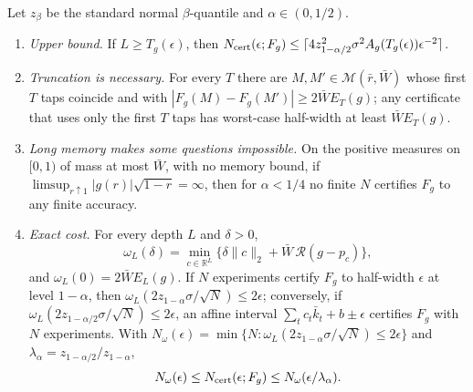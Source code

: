 \begin{theorem}\label{thm:questions}
Let $z_\beta$ be the standard normal $\beta$-quantile and $\alpha\in(0,1/2)$.
\begin{enumerate}[label=(\roman*)]
\item \emph{Upper bound.} If $L\ge T_g(\epsilon)$, then $N_{\rm cert}(\epsilon;F_g)\le\lceil4z_{1-\alpha/2}^2\sigma^2A_g(T_g(\epsilon))\epsilon^{-2}\rceil$.
\item \emph{Truncation is necessary.} For every $T$ there are $M,M'\in\mathcal M(\bar r,\bar W)$ whose first $T$ taps coincide and with $|F_g(M)-F_g(M')|\ge2\bar WE_T(g)$; any certificate that uses only the first $T$ taps has worst-case half-width at least $\bar WE_T(g)$.
\item \emph{Long memory makes some questions impossible.} On the positive measures on $[0,1)$ of mass at most $\bar W$, with no memory bound, if $\limsup_{r\uparrow1}|g(r)|\sqrt{1-r}=\infty$, then for $\alpha<1/4$ no finite $N$ certifies $F_g$ to any finite accuracy.
\item \emph{Exact cost.} For every depth $L$ and $\delta>0$,
\[
 \omega_L(\delta)=\min_{c\in\mathbb R^L}\bigl\{\delta\|c\|_2+\bar W\,\mathcal R(g-p_c)\bigr\},
\]
and $\omega_L(0)=2\bar WE_L(g)$. If $N$ experiments certify $F_g$ to half-width $\epsilon$ at level $1-\alpha$, then $\omega_L(2z_{1-\alpha}\sigma/\sqrt N)\le2\epsilon$; conversely, if $\omega_L(2z_{1-\alpha/2}\sigma/\sqrt N)\le2\epsilon$, an affine interval $\sum_tc_t\bar k_t+b\pm\epsilon$ certifies $F_g$ with $N$ experiments. With $N_\omega(\epsilon)=\min\{N:\omega_L(2z_{1-\alpha}\sigma/\sqrt N)\le2\epsilon\}$ and $\lambda_\alpha=z_{1-\alpha/2}/z_{1-\alpha}$,
\[
 N_\omega(\epsilon)\le N_{\rm cert}(\epsilon;F_g)\le N_\omega(\epsilon/\lambda_\alpha).
\]
\end{enumerate}
\end{theorem}

